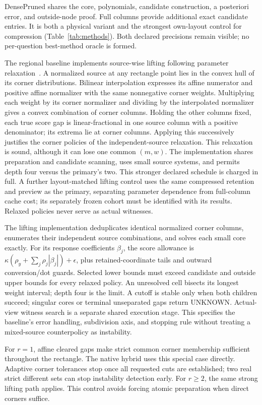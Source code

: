 \documentclass[conference]{IEEEtran}
\newcommand{\unknown}{\textsf{UNKNOWN}}
\begin{document}
DensePruned shares the core, polynomials, candidate construction, a posteriori error, and outside-node proof. Full columns provide additional exact candidate entries. It is both a physical variant and the strongest own-layout control for compression (Table~\ref{tab:methods}). Both declared precisions remain visible; no per-question best-method oracle is formed.

The regional baseline implements source-wise lifting following parameter relaxation~\cite{lifting}. A normalized source at any rectangle point lies in the convex hull of its corner distributions. Bilinear interpolation expresses its affine numerator and positive affine normalizer with the same nonnegative corner weights. Multiplying each weight by its corner normalizer and dividing by the interpolated normalizer gives a convex combination of corner columns. Holding the other columns fixed, each true score gap is linear-fractional in one source column with a positive denominator; its extrema lie at corner columns. Applying this successively justifies the corner policies of the independent-source relaxation. This relaxation is sound, although it can lose one common $(m,w)$. The implementation shares preparation and candidate scanning, uses small source systems, and permits depth four versus the primary's two. This stronger declared schedule is charged in full. A further layout-matched lifting control uses the same compressed retention and preview as the primary, separating parameter dependence from full-column cache cost; its separately frozen cohort must be identified with its results. Relaxed policies never serve as actual witnesses.

The lifting implementation deduplicates identical normalized corner columns, enumerates their independent source combinations, and solves each small core exactly. For its response coefficients $\beta_j$, the score allowance is $\kappa(\rho_y+\sum_j\rho_j|\beta_j|)+\epsilon$, plus retained-coordinate tails and outward conversion/dot guards. Selected lower bounds must exceed candidate and outside upper bounds for every relaxed policy. An unresolved cell bisects its longest weight interval; depth four is the limit. A cutoff is stable only when both children succeed; singular cores or terminal unseparated gaps return \unknown. Actual-view witness search is a separate shared execution stage. This specifies the baseline's error handling, subdivision axis, and stopping rule without treating a mixed-source counterpolicy as instability.

For $r=1$, affine cleared gaps make strict common corner membership sufficient throughout the rectangle. The native hybrid uses this special case directly. Adaptive corner tolerances stop once all requested cuts are established; two real strict different sets can stop instability detection early. For $r\geq2$, the same strong lifting path applies. This control avoids forcing atomic preparation when direct corners suffice.
\end{document}
